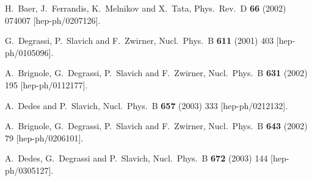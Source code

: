 \documentclass[final,3p,11pt,pdflatex]{elsarticle}
\begin{document}
\begin{thebibliography}{100}
  H.~Baer, J.~Ferrandis, K.~Melnikov and X.~Tata,
  Phys.\ Rev.\ D {\bf 66} (2002) 074007
  [hep-ph/0207126].

  G.~Degrassi, P.~Slavich and F.~Zwirner,
  Nucl.\ Phys.\ B {\bf 611} (2001) 403
  [hep-ph/0105096].

  A.~Brignole, G.~Degrassi, P.~Slavich and F.~Zwirner,
  Nucl.\ Phys.\ B {\bf 631} (2002) 195
  [hep-ph/0112177].

  A.~Dedes and P.~Slavich,
  Nucl.\ Phys.\ B {\bf 657} (2003) 333
  [hep-ph/0212132].

  A.~Brignole, G.~Degrassi, P.~Slavich and F.~Zwirner,
  Nucl.\ Phys.\ B {\bf 643} (2002) 79
  [hep-ph/0206101].

  A.~Dedes, G.~Degrassi and P.~Slavich,
  Nucl.\ Phys.\ B {\bf 672} (2003) 144
  [hep-ph/0305127].


\end{thebibliography}
\end{document}
